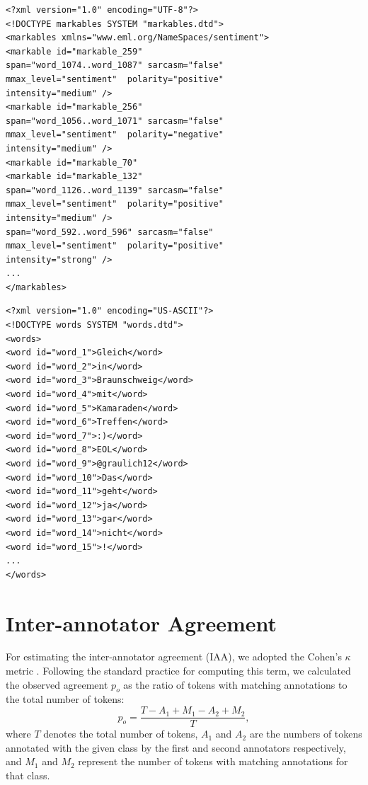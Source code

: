 \begin{minipage}[t]{\textwidth}
  \begin{minipage}[t]{0.45\textwidth}
    \begin{lstlisting}[basicstyle=\tiny]
<?xml version="1.0" encoding="UTF-8"?>
<!DOCTYPE markables SYSTEM "markables.dtd">
<markables xmlns="www.eml.org/NameSpaces/sentiment">
<markable id="markable_259"
span="word_1074..word_1087" sarcasm="false"
mmax_level="sentiment"  polarity="positive"
intensity="medium" />
<markable id="markable_256"
span="word_1056..word_1071" sarcasm="false"
mmax_level="sentiment"  polarity="negative"
intensity="medium" />
<markable id="markable_70"
<markable id="markable_132"
span="word_1126..word_1139" sarcasm="false"
mmax_level="sentiment"  polarity="positive"
intensity="medium" />
span="word_592..word_596" sarcasm="false"
mmax_level="sentiment"  polarity="positive"
intensity="strong" />
...
</markables>
    \end{lstlisting}%
  \end{minipage}\hfill%
  \begin{minipage}[t]{0.45\textwidth}%
    \begin{lstlisting}[basicstyle=\tiny]
<?xml version="1.0" encoding="US-ASCII"?>
<!DOCTYPE words SYSTEM "words.dtd">
<words>
<word id="word_1">Gleich</word>
<word id="word_2">in</word>
<word id="word_3">Braunschweig</word>
<word id="word_4">mit</word>
<word id="word_5">Kamaraden</word>
<word id="word_6">Treffen</word>
<word id="word_7">:)</word>
<word id="word_8">EOL</word>
<word id="word_9">@graulich12</word>
<word id="word_10">Das</word>
<word id="word_11">geht</word>
<word id="word_12">ja</word>
<word id="word_13">gar</word>
<word id="word_14">nicht</word>
<word id="word_15">!</word>
...
</words>
    \end{lstlisting}%
  \end{minipage}
\end{minipage}

\section{Inter-annotator Agreement}\label{subsec:snt:iaa}

For estimating the inter-annotator agreement (IAA), we adopted the
Cohen's $\kappa$ metric \cite{Cohen:60}.  Following the standard
practice for computing this term, we calculated the observed agreement
$p_o$ as the ratio of tokens with matching annotations to the total
number of tokens:
\begin{equation*}\textstyle
  p_o = \frac{T - A_1 + M_1 - A_2 + M_2}{T},
\end{equation*}
where $T$ denotes the total number of tokens, $A_1$ and $A_2$ are the
numbers of tokens annotated with the given class by the first and
second annotators respectively, and $M_1$ and $M_2$ represent the
number of tokens with matching annotations for that class.

